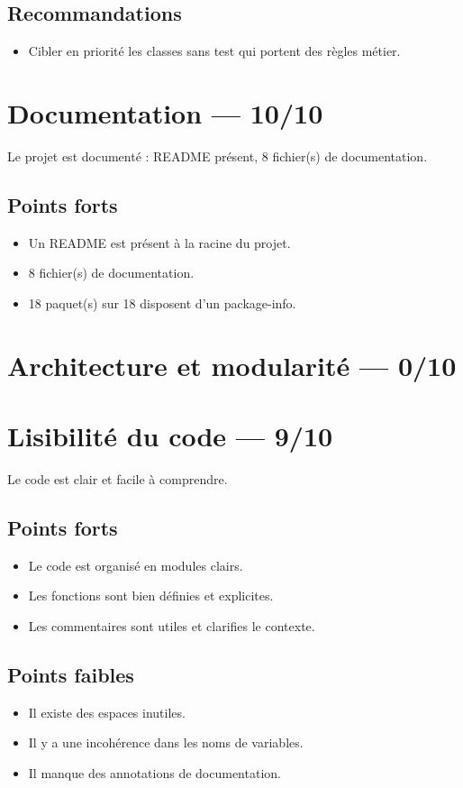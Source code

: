 \documentclass[11pt,a4paper]{article}
\begin{document}
\subsection*{Recommandations}
\begin{itemize}
  \item Cibler en priorité les classes sans test qui portent des règles métier.
\end{itemize}

\section{Documentation — 10/10}
Le projet est documenté : README présent, 8 fichier(s) de documentation.

\subsection*{Points forts}
\begin{itemize}
  \item Un README est présent à la racine du projet.
  \item 8 fichier(s) de documentation.
  \item 18 paquet(s) sur 18 disposent d'un package-info.
\end{itemize}

\section{Architecture et modularité — 0/10}
\section{Lisibilité du code — 9/10}
Le code est clair et facile à comprendre.

\subsection*{Points forts}
\begin{itemize}
  \item Le code est organisé en modules clairs.
  \item Les fonctions sont bien définies et explicites.
  \item Les commentaires sont utiles et clarifies le contexte.
\end{itemize}

\subsection*{Points faibles}
\begin{itemize}
  \item Il existe des espaces inutiles.
  \item Il y a une incohérence dans les noms de variables.
  \item Il manque des annotations de documentation.
\end{itemize}
\end{document}
